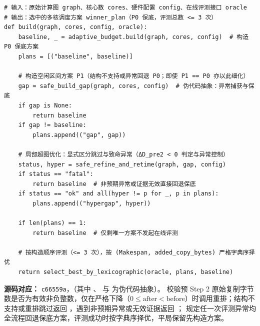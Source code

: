 \documentclass[anonymous,withtoc]{gmcm2026}
\renewcommand{\thealgorithm}{\thesection-\arabic{algorithm}}
\begin{document}
\FloatBarrier
\FloatBarrier\par{}\begingroup\normalsize
\captionsetup{type=algorithm,position=top,justification=raggedright,singlelinecheck=false,labelfont=bf}
\label{alg:p2-adaptive-hypergap}
\begin{tcolorbox}[enhanced,breakable,colback=white,colframe=black,
  boxrule=0pt,toprule=.4pt,bottomrule=.4pt,sharp corners,boxsep=0pt,
  left=0pt,right=0pt,top=4pt,bottom=4pt,before skip=2pt,after skip=2pt,
  title after break={算法~\thealgorithm（续）},
  colbacktitle=white,coltitle=black,fonttitle=\normalsize\bfseries]



\begin{lstlisting}[style=paperpseudo]
# 输入：原始计算图 graph、核心数 cores、硬件配置 config、在线评测接口 oracle
# 输出：选中的多核调度方案 winner_plan（P0 保底，评测总数 <= 3 次）
def build(graph, cores, config, oracle):
    baseline, _ = adaptive_budget.build(graph, cores, config)  # 构造 P0 保底方案
    plans = [("baseline", baseline)]

    # 构造空闲区间方案 P1（结构不支持或异常回退 P0；即使 P1 == P0 亦以此细化）
    gap = safe_build_gap(graph, cores, config)  # 伪代码抽象：异常捕获与保底
    if gap is None:
        return baseline
    if gap != baseline:
        plans.append(("gap", gap))

    # 局部超图优化：显式区分跳过与致命异常（ΔD_pre2 < 0 判定与异常控制）
    status, hyper = safe_refine_and_retime(graph, gap, config)
    if status == "fatal":
        return baseline  # 非预期异常或证据无效直接回退保底
    if status == "ok" and all(hyper != p for _, p in plans):
        plans.append(("hypergap", hyper))

    if len(plans) == 1:
        return baseline  # 仅剩唯一方案不发起在线评测

    # 按构造顺序评测（<= 3 次），按 (Makespan, added_copy_bytes) 严格字典序择优
    return select_best_by_lexicographic(oracle, plans, baseline)
\end{lstlisting}
\textbf{源码对应：} \texttt{c66559a}，\texttt{}（其中 \texttt{}、\texttt{} 与 \texttt{} 为伪代码抽象）。\texttt{} 校验预 Step 2 原始复制字节数是否为有效非负整数，仅在严格下降（\(0 \le \text{after} < \text{before}\)）时调用重排；结构不支持或重排跳过返回 \texttt{}，遇到非预期异常或无效证据返回 \texttt{}；\texttt{} 规定任一次评测异常均全流程回退保底方案，评测成功时按字典序择优，平局保留先构造方案。

\end{tcolorbox}\endgroup
\end{document}
